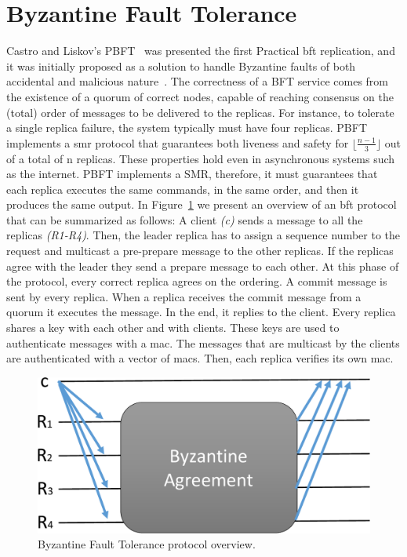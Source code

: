 \section{Byzantine Fault Tolerance}

Castro and Liskov’s \textsc{PBFT}~\cite{Castro:1999} was presented the first Practical \gls{bft} replication, and it was initially proposed as a solution to handle Byzantine faults of both accidental and malicious nature~\cite{Castro:1999}.
The correctness of a BFT service comes from the existence of a quorum of correct nodes, capable of reaching consensus on the (total) order of messages to be delivered to the replicas.
For instance, to tolerate a single replica failure, the system typically must have four replicas. 
\textsc{PBFT} implements a \gls{smr} protocol that guarantees both liveness and safety for $\lfloor\frac{n-1}{3}\rfloor$ out of a total of n replicas. 
These properties hold even in asynchronous systems such as the internet. 
\textsc{PBFT} implements a SMR, therefore, it must guarantees that each replica executes the same commands, in the same order, and then it produces the same output. 
In Figure~\ref{fig:bft} we present an overview of an \gls{bft} protocol that can be summarized as follows:
A client \emph{(c)} sends a message to all the replicas \emph{(R1-R4)}.
Then, the leader replica has to assign a sequence number to the request and multicast a pre-prepare message to the other replicas. 
If the replicas agree with the leader they send a prepare message to each other. 
At this phase of the protocol, every correct replica agrees on the ordering. 
A commit message is sent by every replica. When a replica receives the commit message from a quorum it executes the message. 
In the end, it replies to the client. 
Every replica shares a key with each other and with clients. These keys are used to authenticate messages with a \gls{mac}. 
The messages that are multicast by the clients are authenticated with a vector of \glspl{mac}. 
Then, each replica verifies its own \gls{mac}.

\begin{figure}[h]
\begin{center}
\includegraphics[width=.5\columnwidth]{images/images/bft.pdf}
\caption{Byzantine Fault Tolerance protocol overview.}
\label{fig:bft}
\end{center}
\end{figure}

